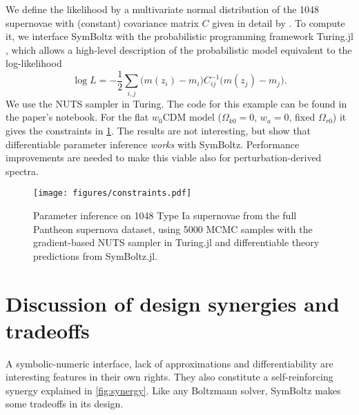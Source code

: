\documentclass{aa}
\begin{document}
We define the likelihood by a multivariate normal distribution of the 1048 supernovae with (constant) covariance matrix $C$ given in detail by \cite{scolnicCompleteLightcurveSample2018}.
To compute it, we interface SymBoltz with the probabilistic programming framework Turing.jl \citep{fjeldeTuringjlGeneralPurposeProbabilistic2025}, which allows a high-level description of the probabilistic model equivalent to the log-likelihood
\begin{equation}
    \log L = -\frac12 \sum_{i,j} \big(m(z_i)-m_i\big) C^{-1}_{ij} \big(m(z_j)-m_j\big) .
\end{equation}
We use the NUTS sampler in Turing.
The code for this example can be found in the paper's notebook.
For the flat $w_0 \text{CDM}$ model ($\Omega_{k0} = 0$, $w_a = 0$, fixed $\Omega_{r0}$) it gives the constraints in \cref{fig:sn}.
The results are not interesting, but show that differentiable parameter inference \emph{works} with SymBoltz.
Performance improvements are needed to make this viable also for perturbation-derived spectra.

\begin{figure}
    \centering
    \texttt{[image: figures/constraints.pdf]}
    \caption{Parameter inference on 1048 Type Ia supernovae from the full Pantheon supernova dataset, using 5000 MCMC samples with the gradient-based NUTS sampler in Turing.jl and differentiable theory predictions from SymBoltz.jl.}
    \label{fig:sn}
\end{figure}

\section{Discussion of design synergies and tradeoffs}
\label{sec:discussion}

A symbolic-numeric interface, lack of approximations and differentiability are interesting features in their own rights.
They also constitute a self-reinforcing synergy explained in \cref{fig:synergy}.
Like any Boltzmann solver, SymBoltz makes some tradeoffs in its design.
\end{document}
